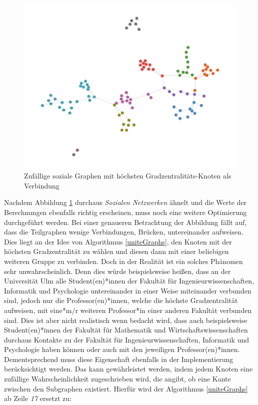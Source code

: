 \FloatBarrier
\begin{figure}[h!]
    \centering
    \hspace*{-1.5cm}
    \includegraphics[width=1.0\textwidth]{Graphics/NearSocialNetwork.jpg}
    \caption{Zufällige soziale Graphen mit höchsten Gradzentralitäts-Knoten als Verbindung }
    \label{NearSozialerGraph}
\end{figure}

\newpage
Nachdem Abbildung \ref{NearSozialerGraph} durchaus \textit{Sozialen Netzwerken} ähnelt und die Werte der Berechnungen ebenfalls richtig erscheinen, muss noch eine weitere Optimierung durchgeführt werden. Bei einer genaueren Betrachtung der Abbildung fällt auf, dass die Teilgraphen wenige Verbindungen, Brücken, untereinander aufweisen. Dies liegt an der Idee von Algorithmus \ref{uniteGraphs}, den Knoten mit der höchsten Gradzentralität zu wählen und diesen dann mit einer beliebigen weiteren Gruppe zu verbinden. Doch in der Realität ist ein solches Phänomen sehr unwahrscheinlich. Denn dies würde beispielsweise heißen, dass an der Universität Ulm alle Student(en)*innen der Fakultät für Ingenieurwissenschaften, Informatik und Psychologie untereinander in einer Weise miteinander verbunden sind, jedoch nur die Professor(en)*innen, welche die höchste Gradzentralität aufweisen, mit eine*m/r weiteren Professor*in einer anderen Fakultät verbunden sind. Dies ist aber nicht realistisch wenn bedacht wird, dass auch beispielsweise Student(en)*innen der Fakultät für Mathematik und Wirtschaftswissenschaften durchaus Kontakte zu der Fakultät für Ingenieurwissenschaften, Informatik und Psychologie haben können oder auch mit den jeweiligen Professor(en)*innen. Dementsprechend muss diese Eigenschaft ebenfalls in der Implementierung berücksichtigt werden. Das kann gewährleistet werden, indem jedem Knoten eine zufällige Wahrscheinlichkeit zugeschrieben wird, die angibt, ob eine Kante zwischen den Subgraphen existiert. Hierfür wird der Algorithmus \ref{uniteGraphs} ab Zeile \textit{17} ersetzt zu:

